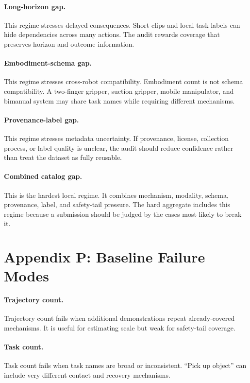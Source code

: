 \documentclass{article}
\begin{document}
\paragraph{Long-horizon gap.}
This regime stresses delayed consequences. Short clips and local task labels can hide dependencies across many actions. The audit rewards coverage that preserves horizon and outcome information.

\paragraph{Embodiment-schema gap.}
This regime stresses cross-robot compatibility. Embodiment count is not schema compatibility. A two-finger gripper, suction gripper, mobile manipulator, and bimanual system may share task names while requiring different mechanisms.

\paragraph{Provenance-label gap.}
This regime stresses metadata uncertainty. If provenance, license, collection process, or label quality is unclear, the audit should reduce confidence rather than treat the dataset as fully reusable.

\paragraph{Combined catalog gap.}
This is the hardest local regime. It combines mechanism, modality, schema, provenance, label, and safety-tail pressure. The hard aggregate includes this regime because a submission should be judged by the cases most likely to break it.

\section{Appendix P: Baseline Failure Modes}
\paragraph{Trajectory count.}
Trajectory count fails when additional demonstrations repeat already-covered mechanisms. It is useful for estimating scale but weak for safety-tail coverage.

\paragraph{Task count.}
Task count fails when task names are broad or inconsistent. ``Pick up object'' can include very different contact and recovery mechanisms.
\end{document}
